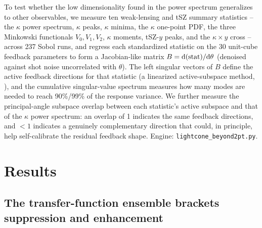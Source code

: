 \documentclass[11pt]{article}
\begin{document}
To test whether the low dimensionality found in the power spectrum
generalizes to other observables, we measure ten weak-lensing and
tSZ summary statistics -- the $\kappa$ power spectrum, $\kappa$ peaks,
$\kappa$ minima, the $\kappa$ one-point PDF, the three Minkowski functionals
$V_0,V_1,V_2$, $\kappa$ moments, tSZ-$y$ peaks, and the $\kappa\times y$ cross
-- across 237 Sobol runs, and regress each standardized statistic on the 30
unit-cube feedback parameters to form a Jacobian-like matrix $B={\rm
d(stat)/d}\theta$ (denoised against shot noise uncorrelated with $\theta$).
The left singular vectors of $B$ define the active feedback directions for
that statistic (a linearized active-subspace method, \citealt{constantine2015}),
and the cumulative singular-value spectrum measures how many modes are needed
to reach 90\%/99\% of the response variance. We further measure the
principal-angle subspace overlap between each statistic's active subspace and
that of the $\kappa$ power spectrum: an overlap of 1 indicates the same
feedback directions, and $<1$ indicates a genuinely complementary direction
that could, in principle, help self-calibrate the residual feedback shape.
Engine: \texttt{lightcone\_beyond2pt.py}.

\section{Results}\label{sec:results}

\subsection{The transfer-function ensemble brackets suppression and enhancement}\label{sec:res-transfer}
\end{document}
